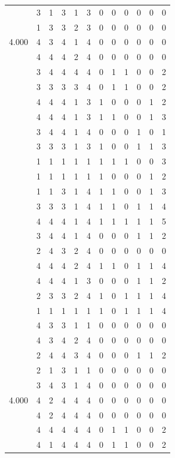 \documentclass[]{msu-thesis}
\theoremstyle{definition}
\theoremstyle{definition}
\theoremstyle{definition}
\theoremstyle{remark}
\begin{document}
\begin{table}
{\begin{tabular}[t]{rrrrrrrrrrrr}
 & 3 & 1 & 3 & 1 & 3 & 0 & 0 & 0 & 0 & 0 & 0\\
 & 1 & 3 & 3 & 2 & 3 & 0 & 0 & 0 & 0 & 0 & 0\\
4.000 & 4 & 3 & 4 & 1 & 4 & 0 & 0 & 0 & 0 & 0 & 0\\
 & 4 & 4 & 4 & 2 & 4 & 0 & 0 & 0 & 0 & 0 & 0\\
 & 3 & 4 & 4 & 4 & 4 & 0 & 1 & 1 & 0 & 0 & 2\\
 & 3 & 3 & 3 & 3 & 4 & 0 & 1 & 1 & 0 & 0 & 2\\
 & 4 & 4 & 4 & 1 & 3 & 1 & 0 & 0 & 0 & 1 & 2\\
 & 4 & 4 & 4 & 1 & 3 & 1 & 1 & 0 & 0 & 1 & 3\\
 & 3 & 4 & 4 & 1 & 4 & 0 & 0 & 0 & 1 & 0 & 1\\
 & 3 & 3 & 3 & 1 & 3 & 1 & 0 & 0 & 1 & 1 & 3\\
 & 1 & 1 & 1 & 1 & 1 & 1 & 1 & 1 & 0 & 0 & 3\\
 & 1 & 1 & 1 & 1 & 1 & 1 & 0 & 0 & 0 & 1 & 2\\
 & 1 & 1 & 3 & 1 & 4 & 1 & 1 & 0 & 0 & 1 & 3\\
 & 3 & 3 & 3 & 1 & 4 & 1 & 1 & 0 & 1 & 1 & 4\\
 & 4 & 4 & 4 & 1 & 4 & 1 & 1 & 1 & 1 & 1 & 5\\
 & 3 & 4 & 4 & 1 & 4 & 0 & 0 & 0 & 1 & 1 & 2\\
 & 2 & 4 & 3 & 2 & 4 & 0 & 0 & 0 & 0 & 0 & 0\\
 & 4 & 4 & 4 & 2 & 4 & 1 & 1 & 0 & 1 & 1 & 4\\
 & 4 & 4 & 4 & 1 & 3 & 0 & 0 & 0 & 1 & 1 & 2\\
 & 2 & 3 & 3 & 2 & 4 & 1 & 0 & 1 & 1 & 1 & 4\\
 & 1 & 1 & 1 & 1 & 1 & 1 & 0 & 1 & 1 & 1 & 4\\
 & 4 & 3 & 3 & 1 & 1 & 0 & 0 & 0 & 0 & 0 & 0\\
 & 4 & 3 & 4 & 2 & 4 & 0 & 0 & 0 & 0 & 0 & 0\\
 & 2 & 4 & 4 & 3 & 4 & 0 & 0 & 0 & 1 & 1 & 2\\
 & 2 & 1 & 3 & 1 & 1 & 0 & 0 & 0 & 0 & 0 & 0\\
 & 3 & 4 & 3 & 1 & 4 & 0 & 0 & 0 & 0 & 0 & 0\\
4.000 & 4 & 2 & 4 & 4 & 4 & 0 & 0 & 0 & 0 & 0 & 0\\
 & 4 & 2 & 4 & 4 & 4 & 0 & 0 & 0 & 0 & 0 & 0\\
 & 4 & 4 & 4 & 4 & 4 & 0 & 1 & 1 & 0 & 0 & 2\\
 & 4 & 1 & 4 & 4 & 4 & 0 & 1 & 1 & 0 & 0 & 2\\

\end{tabular}}
\end{table}
\end{document}
